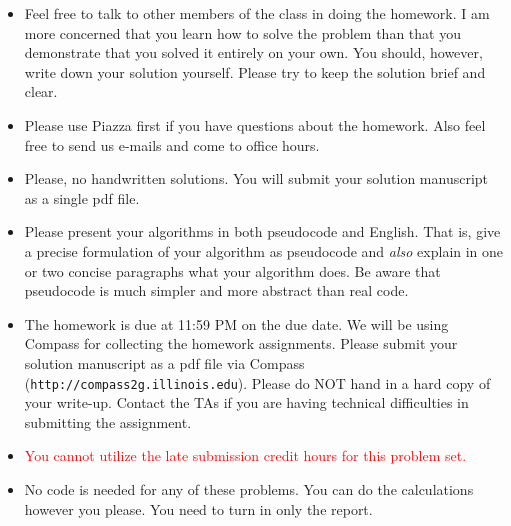 
\usepackage{graphicx,amssymb,amsmath,url}
\usepackage{xcolor}
\sloppy
\newcommand{\ignore}[1]{}
\newcommand{\bx}{{\bf x}}
\newcommand{\bw}{{\bf w}}

\oddsidemargin 0in
\evensidemargin 0in
\textwidth 6.5in
\topmargin -0.5in
\textheight 9.0in

\newcommand{\bb}[1]{{\bf #1}}





\begin{footnotesize}
\begin{itemize}
\item Feel free to talk to other members of the class in doing the homework.  I am
more concerned that you learn how to solve the problem than that you
demonstrate that you solved it entirely on your own.  You should, however,
write down your solution yourself.  Please try to keep the solution brief and
clear.

\item Please use Piazza first if you have questions about the homework.
  Also feel free to send us e-mails and come to office hours.

\item Please, no handwritten solutions. You will submit your solution manuscript as a single pdf file.

\item Please present your algorithms in both pseudocode and English.  That is, give
a precise formulation of your algorithm as pseudocode and {\em also} explain
in one or two concise paragraphs what your algorithm does.  Be aware that
pseudocode is much simpler and more abstract than real code. 

\item The homework is due at 11:59 PM on the due date. We will be using
Compass for collecting the homework assignments. Please submit your solution manuscript as a pdf file via Compass
(\texttt{http://compass2g.illinois.edu}). Please do NOT hand in a hard copy of your write-up.
Contact the TAs if you are having technical difficulties in
submitting the assignment.

\item \textcolor{red}{You cannot utilize the late submission credit hours for this problem set.}

\item No code is needed for any of these problems. You can do the
calculations however you please. You need to turn in only the report.

\end{itemize}
\end{footnotesize}
